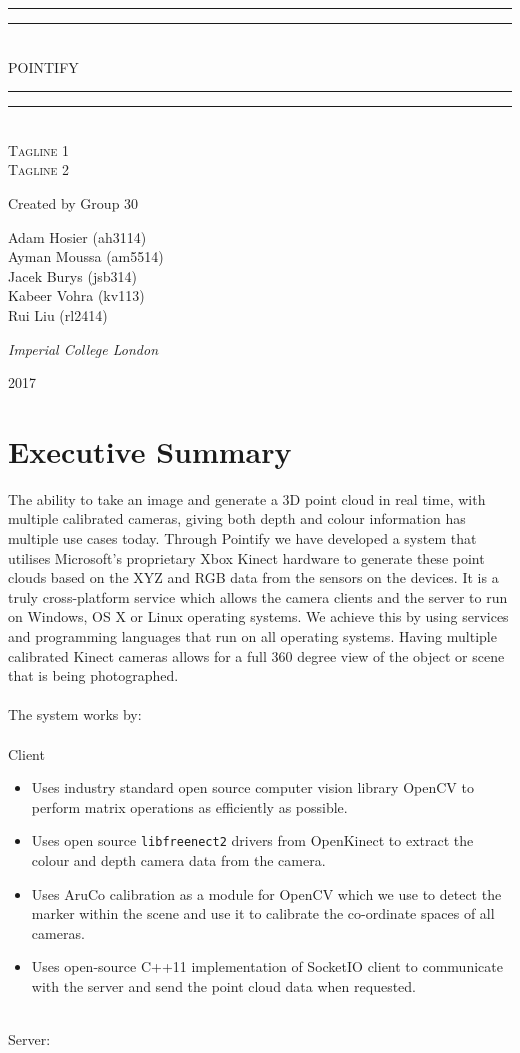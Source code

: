 \documentclass{article}
\newcommand*{\titleGP}{\begingroup %
\centering %
\vspace*{\baselineskip} %

\rule{\textwidth}{1.6pt}\vspace*{-\baselineskip}\vspace*{2pt} %
\rule{\textwidth}{0.4pt}\\[\baselineskip] %

{\LARGE POINTIFY}\\[0.2\baselineskip] %

\rule{\textwidth}{0.4pt}\vspace*{-\baselineskip}\vspace{3.2pt} %
\rule{\textwidth}{1.6pt}\\[\baselineskip] %

\scshape %
Tagline 1 \\ 
Tagline 2\par

\vspace*{2\baselineskip}

Created by Group 30\\[\baselineskip]
{\Large Adam Hosier (ah3114)\\ Ayman Moussa (am5514) \\Jacek Burys (jsb314) \\Kabeer Vohra (kv113) \\ Rui Liu (rl2414) \\  \par} %

\vspace*{1\baselineskip}
{\itshape Imperial College London\par} %

\vfill 

{\scshape 2017} \\[0.3\baselineskip] %

\endgroup}
\begin{document}
 

\titleGP
\thispagestyle{empty}

\newpage
\setcounter{page}{1}
\tableofcontents

\newpage
\section{Executive Summary}

The ability to take an image and generate a 3D point cloud in real time, with multiple calibrated cameras, giving both depth and colour information has multiple use cases today. Through Pointify we have developed a system that utilises Microsoft's proprietary Xbox Kinect hardware to generate these point clouds based on the XYZ and RGB data from the sensors on the devices. It is a truly cross-platform service which allows the camera clients and the server to run on Windows, OS X or Linux operating systems. We achieve this by using services and programming languages that run on all operating systems. Having multiple calibrated Kinect cameras allows for a full 360 degree view of the object or scene that is being photographed.
\\\\
The system works by:
\\\\
Client
\begin{itemize}
\item Uses industry standard open source computer vision library OpenCV to perform matrix operations as efficiently as possible.
\item Uses open source \texttt{libfreenect2} drivers from OpenKinect to extract the colour and depth camera data from the camera.
\item Uses AruCo calibration as a module for OpenCV which we use to detect the marker within the scene and use it to calibrate the co-ordinate spaces of all cameras.
\item Uses open-source C++11 implementation of SocketIO client to communicate with the server and send the point cloud data when requested.
\end{itemize}
~\\
Server:
\end{document}
